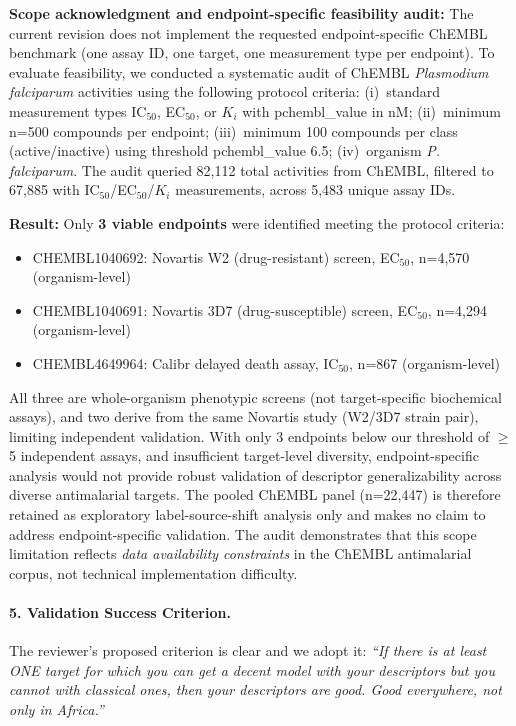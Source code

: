\documentclass[11pt]{article}
\begin{document}
\textbf{Scope acknowledgment and endpoint-specific feasibility audit:} The current revision does not 
implement the requested endpoint-specific ChEMBL benchmark (one assay ID, one target, one measurement 
type per endpoint). To evaluate feasibility, we conducted a systematic audit of ChEMBL \textit{Plasmodium 
falciparum} activities using the following protocol criteria: (i)~standard measurement types IC$_{50}$, 
EC$_{50}$, or $K_i$ with pchembl\_value in nM; (ii)~minimum n=500 compounds per endpoint; (iii)~minimum 
100 compounds per class (active/inactive) using threshold pchembl\_value 6.5; (iv)~organism \textit{P. 
falciparum}. The audit queried 82,112 total activities from ChEMBL, filtered to 67,885 with IC$_{50}$/EC$_{50}$/$K_i$ 
measurements, across 5,483 unique assay IDs.

\textbf{Result:} Only \textbf{3 viable endpoints} were identified meeting the protocol criteria:
\begin{itemize}[leftmargin=1.6em]
\item CHEMBL1040692: Novartis W2 (drug-resistant) screen, EC$_{50}$, n=4,570 (organism-level)
\item CHEMBL1040691: Novartis 3D7 (drug-susceptible) screen, EC$_{50}$, n=4,294 (organism-level)
\item CHEMBL4649964: Calibr delayed death assay, IC$_{50}$, n=867 (organism-level)
\end{itemize}

All three are whole-organism phenotypic screens (not target-specific biochemical assays), and two 
derive from the same Novartis study (W2/3D7 strain pair), limiting independent validation. With only 
3 endpoints below our threshold of $\geq$5 independent assays, and insufficient target-level diversity, 
endpoint-specific analysis would not provide robust validation of descriptor generalizability across 
diverse antimalarial targets. The pooled ChEMBL panel (n=22,447) is therefore retained as exploratory 
label-source-shift analysis only and makes no claim to address endpoint-specific validation. The audit 
demonstrates that this scope limitation reflects \textit{data availability constraints} in the ChEMBL 
antimalarial corpus, not technical implementation difficulty.

\paragraph{5. Validation Success Criterion.}
The reviewer's proposed criterion is clear and we adopt it: \textit{``If there is at 
least ONE target for which you can get a decent model with your descriptors but you 
cannot with classical ones, then your descriptors are good. Good everywhere, not only 
in Africa.''}
\end{document}
